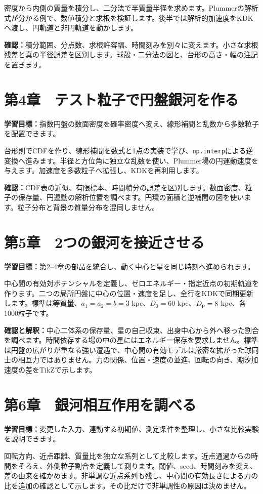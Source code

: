 \documentclass[10pt,openany]{book}
\begin{document}
密度から内側の質量を積分し、二分法で半質量半径を求めます。Plummerの解析式が分かる例で、数値積分と求根を検証します。後半では解析的加速度をKDKへ渡し、円軌道と非円軌道を動かします。

\textbf{確認：}積分範囲、分点数、求根許容幅、時間刻みを別々に変えます。小さな求根残差と真の半径誤差を区別します。球殻・二分法の図と、台形の高さ・幅の注記を置きます。

\section{第4章　テスト粒子で円盤銀河を作る}
\textbf{学習目標：}指数円盤の数面密度を確率密度へ変え、線形補間と乱数から多数粒子を配置できます。

台形則でCDFを作り、線形補間を数式と1点の実装で学び、\texttt{np.interp}による逆変換へ進みます。半径と方位角に独立な乱数を使い、Plummer場の円運動速度を与えます。加速度を多数粒子へ拡張し、KDKを再利用します。

\textbf{確認：}CDF表の近似、有限標本、時間積分の誤差を区別します。数面密度、粒子の保存量、円運動の解析位置を調べます。円環の面積と逆補間の図を使います。粒子分布と背景の質量分布を混同しません。

\section{第5章　2つの銀河を接近させる}
\textbf{学習目標：}第2--4章の部品を統合し、動く中心と星を同じ時刻へ進められます。

中心間の有効対ポテンシャルを定義し、ゼロエネルギー・指定近点の初期軌道を作ります。二つの局所円盤に中心の位置・速度を足し、全行をKDKで同期更新します。標準は等質量、$a_1=a_2=b=3$ kpc、$D_0=60$ kpc、$D_{\rm p}=8$ kpc、各1000粒子です。

\textbf{確認と解釈：}中心二体系の保存量、星の自己収束、出身中心から外へ移った割合を調べます。時間依存する場の中の星にはエネルギー保存を要求しません。標準は円盤の広がりが重なる強い遭遇で、中心間の有効モデルは厳密な拡がった球同士の相互力ではありません。力の関係、位置・速度の並進、回転の向き、潮汐加速度の差をTikZで示します。

\clearpage
\section{第6章　銀河相互作用を調べる}
\textbf{学習目標：}変更した入力、連動する初期値、測定条件を整理し、小さな比較実験を説明できます。

回転方向、近点距離、質量比を独立な系列として比較します。近点通過からの時間をそろえ、外側粒子割合を定義して測ります。閾値、seed、時間刻みを変え、差の由来を確かめます。非単調な近点系列も残し、中心間の有効長さによる力の比を追加の確認として示します。その比だけで非単調性の原因は決めません。
\end{document}
